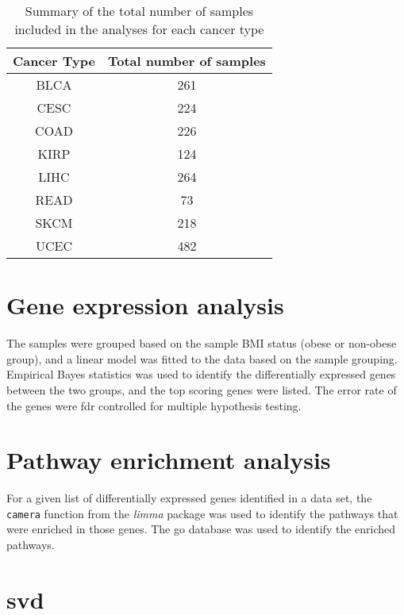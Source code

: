 \begin{table}[h]
	\caption{Summary of the total number of samples included in the analyses for each cancer type}
	\label{tab:samplesize}
	\begin{center}
		\begin{tabular}{cc}
			\textbf{Cancer Type}   & \textbf{Total number of samples} \\
			\hline
			\rule{0pt}{2.25ex}BLCA & 261   \\
			CESC                   & 224   \\
			COAD                   & 226   \\
			KIRP                   & 124   \\
			LIHC                   & 264   \\
			READ                   & 73    \\
			SKCM                   & 218   \\
			UCEC                   & 482   \\
		\end{tabular}
	\end{center}
\end{table}

\section{Gene expression analysis}
\label{sec:gene_expression_analysis}

The samples were grouped based on the sample BMI status (obese or non-obese group), and a linear model was fitted to the data based on the sample grouping.
Empirical Bayes statistics was used to identify the differentially expressed genes between the two groups, and the top scoring genes were listed.
The error rate of the genes were \gls{fdr} controlled for multiple hypothesis testing.

\section{Pathway enrichment analysis}
\label{sec:pathway_enrichment_analysis}

For a given list of differentially expressed genes identified in a data set, the \texttt{camera} function from the \textit{limma} package was used to identify the pathways that were enriched in those genes.
The \gls{go} database was used to identify the enriched pathways.

\section{\gls{svd}}
\label{sec:singular_value_decomposition}

